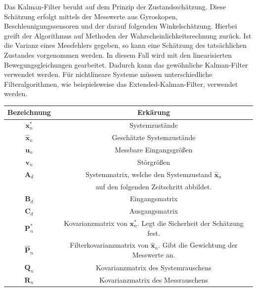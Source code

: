 Das Kalman-Filter beruht auf dem Prinzip der Zustandsschätzung. Diese Schätzung erfolgt mittels der Messwerte aus Gyroskopen, Beschleunigungssensoren und der darauf folgenden Winkelschätzung. Hierbei greift der Algorithmus auf Methoden der Wahrscheinlichkeitsrechnung zurück. Ist die Varianz eines Messfehlers gegeben, so kann eine Schätzung des tatsächlichen Zustandes vorgenommen werden.
In diesem Fall wird mit den linearisierten Bewegungsgleichungen gearbeitet. Dadurch kann das gewöhnliche Kalman-Filter verwendet werden. Für nichtlineare Systeme müssen unterschiedliche Filteralgorithmen, wie beispielsweise das Extended-Kalman-Filter, verwendet werden.


\begin{table}[h!]
\centering
\begin{tabularx}{0.9\textwidth}{|c|c|}
\hline
 \textbf{Bezeichnung}  	& \textbf{Erkärung} \\ \hline
 $\boldsymbol{x}^*_n$	&	Systemzustände \\ \hline
 $\hat{\boldsymbol{x}}_n$ & Geschätzte Systemzustände \\ \hline 
 $\boldsymbol{u}_n$		& 	Messbare Eingangsgrößen  \\ \hline
 $\boldsymbol{v}_n$		&	Störgrößen \\ \hline
 $\boldsymbol{A}_d$ 	& 	Systemmatrix, welche den Systemzustand $\hat{\boldsymbol{x}}_n$  \\  & auf den folgenden Zeitschritt abbildet. \\ \hline
 $\boldsymbol{B}_d$		&	Eingangsmatrix \\ \hline
 $\boldsymbol{C}_d$		&	Ausgangsmatrix \\ \hline
 $\boldsymbol{P}^*_n$	&	Kovarianzmatrix von $\boldsymbol{x}^*_n$. Legt die Sicherheit der Schätzung fest. \\ \hline
 $\hat{\boldsymbol{P}}_n$ & Filterkovarianzmatrix von $\hat{\boldsymbol{x}}_n$. Gibt die Gewichtung der Messwerte an. \\ \hline
 $\boldsymbol{Q}_n$		&	Kovarianzmatrix des Systemrauschens \\ \hline
 $\boldsymbol{R}_n$		& 	Kovarianzmatrix des Messrauschens \\ \hline
\end{tabularx}
\end{table}

